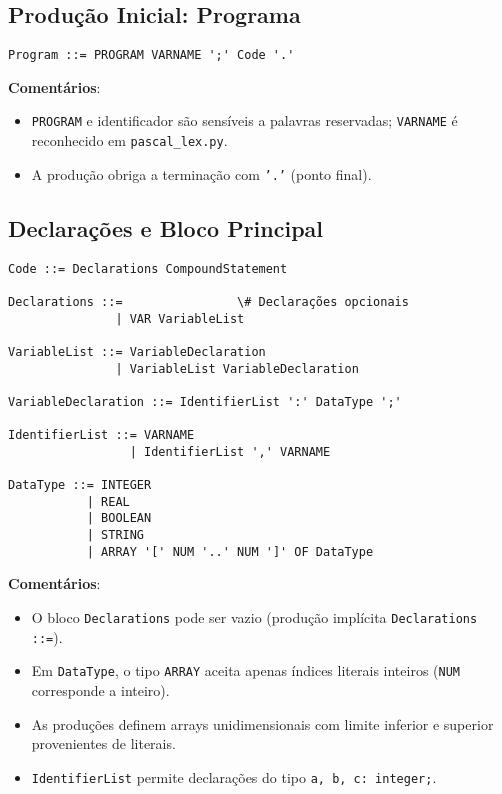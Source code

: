 \subsection{Produção Inicial: Programa}

\begin{verbatim}
Program ::= PROGRAM VARNAME ';' Code '.'
\end{verbatim}

\noindent

\textbf{Comentários}:
\begin{itemize}
    \item \texttt{PROGRAM} e identificador são sensíveis a palavras reservadas; \texttt{VARNAME} é reconhecido em {\tt pascal\_lex.py}.
    \item A produção obriga a terminação com \texttt{'.'} (ponto final).
\end{itemize}

\subsection{Declarações e Bloco Principal}

\begin{verbatim}
Code ::= Declarations CompoundStatement

Declarations ::=                \# Declarações opcionais
               | VAR VariableList

VariableList ::= VariableDeclaration
               | VariableList VariableDeclaration

VariableDeclaration ::= IdentifierList ':' DataType ';'

IdentifierList ::= VARNAME
                 | IdentifierList ',' VARNAME

DataType ::= INTEGER
           | REAL
           | BOOLEAN
           | STRING
           | ARRAY '[' NUM '..' NUM ']' OF DataType
\end{verbatim}

\noindent

\textbf{Comentários}:
\begin{itemize}
    \item O bloco \texttt{Declarations} pode ser vazio (produção implícita \texttt{Declarations ::=}).
    \item Em \texttt{DataType}, o tipo \texttt{ARRAY} aceita apenas índices literais inteiros (\texttt{NUM} corresponde a inteiro). 
    \item As produções definem arrays unidimensionais com limite inferior e superior provenientes de literais.
    \item \texttt{IdentifierList} permite declarações do tipo \texttt{a, b, c: integer;}.
\end{itemize}

